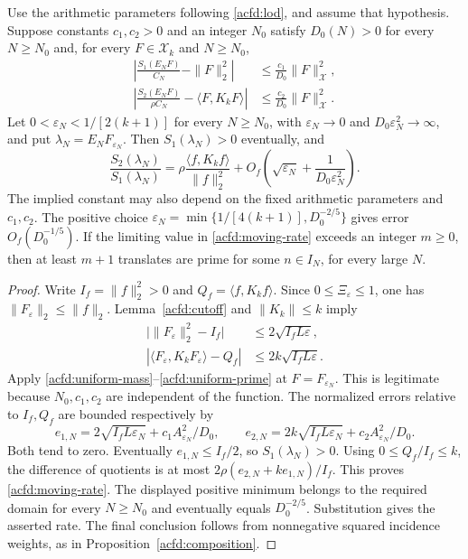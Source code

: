 \begin{theorem}
\label{acfd:moving-cutoff}
Use the arithmetic parameters following \eqref{acfd:lod}, and assume that hypothesis.
Suppose constants $c_1,c_2>0$ and an integer $N_0$ satisfy
$D_0(N)>0$ for every $N\geq N_0$ and, for every $F\in\mathcal X_k$
and $N\geq N_0$,
\begin{align}
 \left|\frac{S_1(E_NF)}{C_N}-\|F\|_2^2\right|
     &\leq\frac{c_1}{D_0}\|F\|_{\mathcal X}^2,\label{acfd:uniform-mass}\\
 \left|\frac{S_2(E_NF)}{\rho C_N}-\langle F,K_kF\rangle\right|
     &\leq\frac{c_2}{D_0}\|F\|_{\mathcal X}^2.\label{acfd:uniform-prime}
\end{align}
Let $0<\varepsilon_N<1/[2(k+1)]$ for every $N\geq N_0$, with
$\varepsilon_N\to0$ and $D_0\varepsilon_N^2\to\infty$, and put
$\lambda_N=E_NF_{\varepsilon_N}$.
Then $S_1(\lambda_N)>0$ eventually, and
\begin{equation}\label{acfd:moving-rate}
 \frac{S_2(\lambda_N)}{S_1(\lambda_N)}
   =\rho\frac{\langle f,K_kf\rangle}{\|f\|_2^2}
       +O_f\left(\sqrt{\varepsilon_N}
                      +\frac1{D_0\varepsilon_N^2}\right).
\end{equation}
The implied constant may also depend on the fixed arithmetic parameters
and $c_1,c_2$.  The positive choice
$\varepsilon_N=\min\{1/[4(k+1)],D_0^{-2/5}\}$ gives error $O_f(D_0^{-1/5})$.
If the limiting value in \eqref{acfd:moving-rate} exceeds an integer $m\geq0$,
then at least $m+1$ translates are prime for some $n\in I_N$, for every large $N$.
\end{theorem}

\begin{proof}
Write $I_f=\|f\|_2^2>0$ and $Q_f=\langle f,K_kf\rangle$.
Since $0\leq\Xi_\varepsilon\leq1$, one has
$\|F_\varepsilon\|_2\leq\|f\|_2$.
Lemma~\ref{acfd:cutoff} and $\|K_k\|\leq k$ imply
\begin{align*}
 \bigl|\|F_\varepsilon\|_2^2-I_f\bigr|
    &\leq2\sqrt{I_fL\varepsilon},\\
 |\langle F_\varepsilon,K_kF_\varepsilon\rangle-Q_f|
    &\leq2k\sqrt{I_fL\varepsilon}.
\end{align*}
Apply \eqref{acfd:uniform-mass}--\eqref{acfd:uniform-prime} at
$F=F_{\varepsilon_N}$.  This is legitimate because $N_0,c_1,c_2$
are independent of the function.
The normalized errors relative to $I_f,Q_f$ are bounded respectively by
\[
 e_{1,N}=2\sqrt{I_fL\varepsilon_N}+c_1A_{\varepsilon_N}^2/D_0,
 \qquad
 e_{2,N}=2k\sqrt{I_fL\varepsilon_N}+c_2A_{\varepsilon_N}^2/D_0.
\]
Both tend to zero.  Eventually $e_{1,N}\leq I_f/2$, so $S_1(\lambda_N)>0$.
Using $0\leq Q_f/I_f\leq k$, the difference of quotients is at most
$2\rho(e_{2,N}+ke_{1,N})/I_f$.
This proves \eqref{acfd:moving-rate}.  The displayed positive minimum
belongs to the required domain for every $N\geq N_0$ and eventually equals
$D_0^{-2/5}$.  Substitution gives the asserted rate.
The final conclusion follows from nonnegative squared incidence weights,
as in Proposition~\ref{acfd:composition}.
\end{proof}


